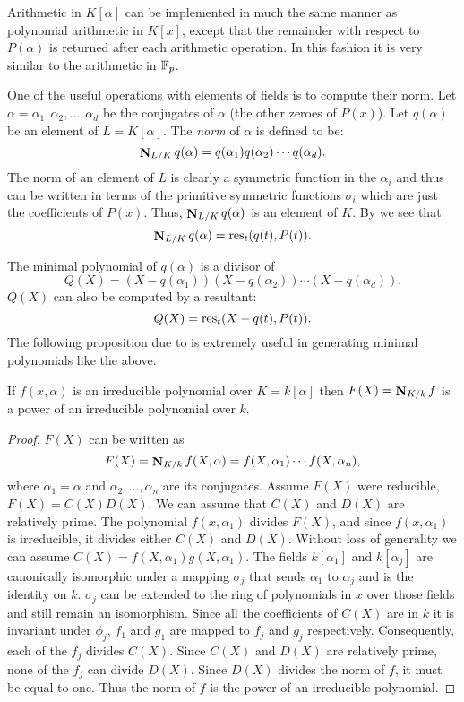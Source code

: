 Arithmetic in $K[\alpha]$ can be implemented in much the same manner
as polynomial arithmetic in $K[x]$, except that the remainder with
respect to $P(\alpha)$ is returned after each arithmetic operation.
In this fashion it is very similar to the arithmetic in
$\mathbb{F}_p$.

One of the useful operations with elements of fields is to compute their
norm.  Let $\alpha = \alpha_1,
\alpha_2, \ldots, \alpha_d$ be the conjugates of
$\alpha$ (the other zeroes of $P(x)$).  Let
$q(\alpha)$ be an element of $L = K[\alpha]$.  The {\em norm} of
$\alpha$ is defined to be:
\[
\mathop{\mathbf{N}}\nolimits_{L/K} q(\alpha) = q(\alpha_1) q(\alpha_2) \cdots q(\alpha_d).
\]
The norm of an element of $L$ is clearly a symmetric function in the
$\alpha_i$ and thus can be written in terms of the primitive symmetric
functions $\sigma_i$ which are just the coefficients of $P(x)$.  Thus,
$\mathop{\mathbf{N}}\nolimits_{L/K} q(\alpha)$ is an element of $K$.  By
 we see that
\[
\mathop{\mathbf{N}}\nolimits_{L/K} q(\alpha) = \mathop{\rm res}\nolimits_t (q(t), P(t)).
\]

The minimal polynomial of $q(\alpha)$ is a divisor of 
\[
Q(X) = (X - q(\alpha_1))(X - q(\alpha_2)) \cdots (X - q(\alpha_d)).
\]
$Q(X)$ can also be computed by a resultant:
\begin{equation} \label{AlgElt:Min:Eq}
Q(X) = \mathop{\rm res}\nolimits_t (X - q(t), P(t)).
\end{equation}
The following proposition due to {\Trager} \cite{Trager1976-ri} is
extremely useful in generating minimal polynomials like the above.

\begin{proposition}[\Trager]
If $f(x, \alpha)$ is an irreducible polynomial over $K = k[\alpha]$
then $F(X) = \mathop{\mathbf{N}}\nolimits_{K/k} f$ is a power of an irreducible polynomial over $k$.
\end{proposition}

\begin{proof}
$F(X)$ can be written as
\[
F(X) = \mathop{\mathbf{N}}\nolimits_{K/k} f(X, \alpha) = f(X, \alpha_1) \cdots f(X, \alpha_n),
\]
where $\alpha_1 = \alpha$ and $\alpha_2, \ldots, \alpha_n$ are its
conjugates. Assume $F(X)$ were reducible, $F(X)= C(X)
D(X)$.  We can assume that $C(X)$ and $D(X)$ are relatively prime.
The polynomial $f(x, \alpha_1)$ divides $F(X)$, and since $f(x,
\alpha_1)$ is irreducible, it divides either $C(X)$ and $D(X)$.
Without loss of generality we can assume $C(X) = f(X, \alpha_1) g(X,
\alpha_1)$.  The fields $k[\alpha_1]$ and $k[\alpha_j]$ are
canonically isomorphic under a mapping $\sigma_j$ that sends
$\alpha_1$ to $\alpha_j$ and is the identity on $k$.  $\sigma_j$ can
be extended to the ring of polynomials in $x$ over those fields and
still remain an isomorphism.  Since all the coefficients of $C(X)$ are
in $k$ it is invariant under $\phi_j$, $f_1$ and $g_1$ are mapped to
$f_j$ and $g_j$ respectively.  Consequently, each of the $f_j$ divides
$C(X)$.  Since $C(X)$ and $D(X)$ are relatively prime, none of the
$f_j$ can divide $D(X)$.  Since $D(X)$ divides the norm of $f$, it
must be equal to one. Thus the norm of $f$ is the power of an
irreducible polynomial.
\end{proof}

